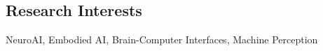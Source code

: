 \subsection*{\textbf{Research Interests}}
NeuroAI, Embodied AI, Brain-Computer Interfaces, Machine Perception